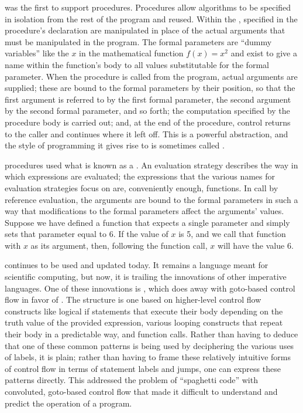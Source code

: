 \Fortran[ II] was the first \Fortran to support procedures. Procedures allow algorithms to be specified in isolation from the rest of the program and reused. Within the ,  specified in the procedure's declaration are manipulated in place of the actual arguments that must be manipulated in the program. The formal parameters are ``dummy variables'' like the $x$ in the mathematical function $f(x) = x^{2}$ and exist to give a name within the function's body to all values substitutable for the formal parameter. When the procedure is called from the program, actual arguments are supplied; these are bound to the formal parameters by their position, so that the first argument is referred to by the first formal parameter, the second argument by the second formal parameter, and so forth; the computation specified by the procedure body is carried out; and, at the end of the procedure, control returns to the caller and continues where it left off. This is a powerful abstraction, and the style of programming it gives rise to is sometimes called .

\Fortran procedures used what is known as a  . An evaluation strategy describes the way in which expressions are evaluated; the expressions that the various names for evaluation strategies focus on are, conveniently enough, functions. In call by reference evaluation, the arguments are bound to the formal parameters in such a way that modifications to the formal parameters affect the arguments' values. Suppose we have defined a function  that expects a single parameter and simply sets that parameter equal to 6. If the value of $x$ is 5, and we call that function with $x$ as its argument, then, following the function call, $x$ will have the value 6.

\Fortran continues to be used and updated today. It remains a language meant for scientific computing, but now, it is trailing the innovations of other imperative languages. One of these innovations is , which does away with goto-based control flow in favor of . The structure is one based on higher-level control flow constructs like logical if statements that execute their body depending on the truth value of the provided expression, various looping constructs that repeat their body in a predictable way, and function calls. Rather than having to deduce that one of these common patterns is being used by deciphering the various uses of labels, it is plain; rather than having to frame these relatively intuitive forms of control flow in terms of statement labels and jumps, one can express these patterns directly. This addressed the problem of ``spaghetti code'' with convoluted, goto-based control flow that made it difficult to understand and predict the operation of a program.

